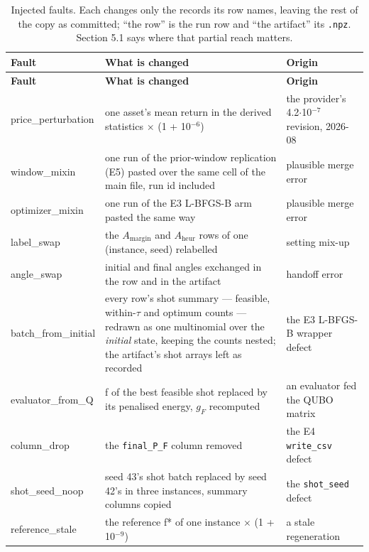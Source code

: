 \documentclass[acmsmall,screen,review]{acmart}
\begin{document}
\begingroup
\small
\setlength\LTleft{\fill}
\setlength\LTright{\fill}
\begin{xltabular}{\textwidth}{>{\hsize}Y>{\hsize}Y>{\hsize}Y}
\caption{Injected faults. Each changes only the records its row names, leaving the rest of the copy as committed; ``the row'' is the run row and ``the artifact'' its \texttt{.npz}. Section 5.1 says where that partial reach matters.}\label{tab:1} \\
\toprule
\textbf{Fault} & \textbf{What is changed} & \textbf{Origin} \\
\midrule
\endfirsthead
\toprule
\textbf{Fault} & \textbf{What is changed} & \textbf{Origin} \\
\midrule
\endhead
\endfoot
\bottomrule
\endlastfoot
price\_perturbation & one asset's mean return in the derived statistics $\times$ (1 + 10$^{-6}$) & the provider's 4.2$\cdot$10$^{-7}$ revision, 2026-08 \\
window\_mixin & one run of the prior-window replication (E5) pasted over the same cell of the main file, run id included & plausible merge error \\
optimizer\_mixin & one run of the E3 L-BFGS-B arm pasted the same way & plausible merge error \\
label\_swap & the $A_{\mathrm{margin}}$ and $A_{\mathrm{heur}}$ rows of one (instance, seed) relabelled & setting mix-up \\
angle\_swap & initial and final angles exchanged in the row and in the artifact & handoff error \\
batch\_from\_initial & every row's shot summary --- feasible, within-$\tau$ and optimum counts --- redrawn as one multinomial over the \textit{initial} state, keeping the counts nested; the artifact's shot arrays left as recorded & the E3 L-BFGS-B wrapper defect \cite[Sec. VI-C]{ref1} \\
evaluator\_from\_Q & f of the best feasible shot replaced by its penalised energy, $g_{F}$ recomputed & an evaluator fed the QUBO matrix \\
column\_drop & the \texttt{final\_P\_F} column removed & the E4 \texttt{write\_csv} defect \\
shot\_seed\_noop & seed 43's shot batch replaced by seed 42's in three instances, summary columns copied & the \texttt{shot\_seed} defect \cite[Sec. VI-C]{ref1} \\
reference\_stale & the reference f* of one instance $\times$ (1 + 10$^{-9}$) & a stale regeneration \\
\end{xltabular}
\endgroup
\end{document}

